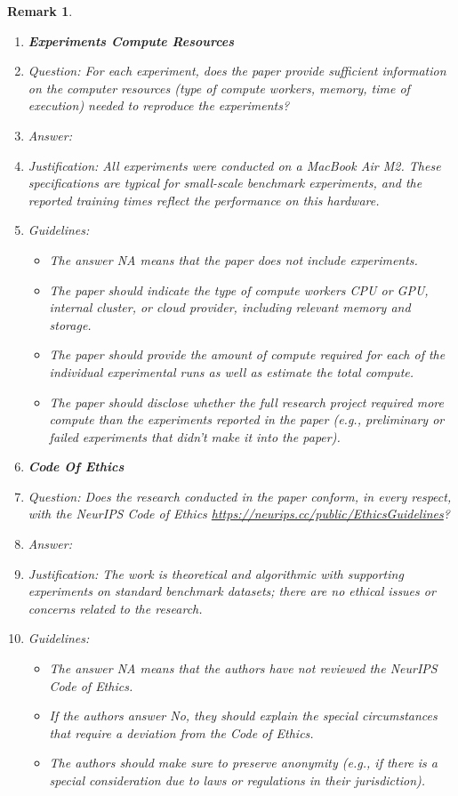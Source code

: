 \documentclass{article}
\newtheorem{remark}{Remark}
\begin{document}
\begin{remark}
\begin{enumerate}
\item {\bf Experiments Compute Resources}
    \item[] Question: For each experiment, does the paper provide sufficient information on the computer resources (type of compute workers, memory, time of execution) needed to reproduce the experiments?
    \item[] Answer: \answerYes{}
    \item[] Justification: All experiments were conducted on a MacBook Air M2. These specifications are typical for small-scale benchmark experiments, and the reported training times reflect the performance on this hardware.
    \item[] Guidelines:
    \begin{itemize}
        \item The answer NA means that the paper does not include experiments.
        \item The paper should indicate the type of compute workers CPU or GPU, internal cluster, or cloud provider, including relevant memory and storage.
        \item The paper should provide the amount of compute required for each of the individual experimental runs as well as estimate the total compute. 
        \item The paper should disclose whether the full research project required more compute than the experiments reported in the paper (e.g., preliminary or failed experiments that didn't make it into the paper). 
    \end{itemize}
    
\item {\bf Code Of Ethics}
    \item[] Question: Does the research conducted in the paper conform, in every respect, with the NeurIPS Code of Ethics \url{https://neurips.cc/public/EthicsGuidelines}?
    \item[] Answer: \answerYes{}
    \item[] Justification: The work is theoretical and algorithmic with supporting experiments on standard benchmark datasets; there are no ethical issues or concerns related to the research.
    \item[] Guidelines:
    \begin{itemize}
        \item The answer NA means that the authors have not reviewed the NeurIPS Code of Ethics.
        \item If the authors answer No, they should explain the special circumstances that require a deviation from the Code of Ethics.
        \item The authors should make sure to preserve anonymity (e.g., if there is a special consideration due to laws or regulations in their jurisdiction).
    \end{itemize}



\end{enumerate}
\end{remark}
\end{document}
